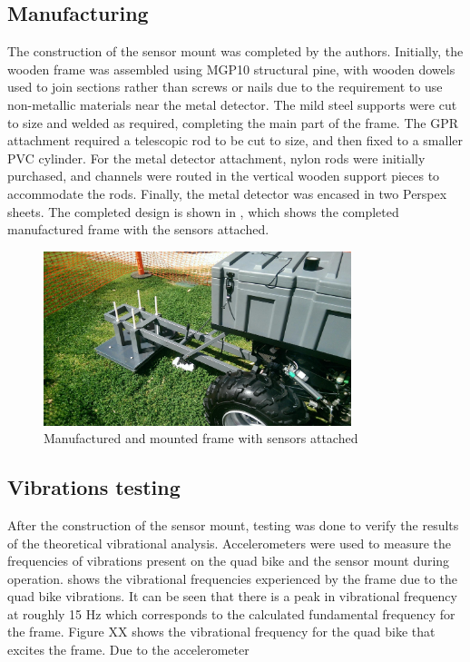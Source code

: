 \documentclass[main.tex]{subfiles}
\begin{document}
\subsection{Manufacturing}
The construction of the sensor mount was completed by the authors. Initially, the wooden frame was assembled using MGP10 structural pine, with wooden dowels used to join sections rather than screws or nails due to the requirement to use non-metallic materials near the metal detector. The mild steel supports were cut to size and welded as required, completing the main part of the frame. The GPR attachment required a telescopic rod to be cut to size, and then fixed to a smaller PVC cylinder. For the metal detector attachment, nylon rods were initially purchased, and channels were routed in the vertical wooden support pieces to accommodate the rods. Finally, the metal detector was encased in two Perspex sheets. The completed design is shown in , which shows the completed manufactured frame with the sensors attached. 
\begin{figure}[!ht]
\includegraphics[width=0.8\textwidth]{4-DetailedDesign/QuadBikeFinalFrame.jpg}
\centering
\caption{Manufactured and mounted frame with sensors attached} 
\end{figure}

\subsection{Vibrations testing}
After the construction of the sensor mount, testing was done to verify the results of the theoretical vibrational analysis. Accelerometers were used to measure the frequencies of vibrations present on the quad bike and the sensor mount during operation.  shows the vibrational frequencies experienced by the frame due to the quad bike vibrations. It can be seen that there is a peak in vibrational frequency at roughly 15 Hz which corresponds to the calculated fundamental frequency for the frame. Figure XX shows the vibrational frequency for the quad bike that excites the frame. Due to the accelerometer    
\end{document}
